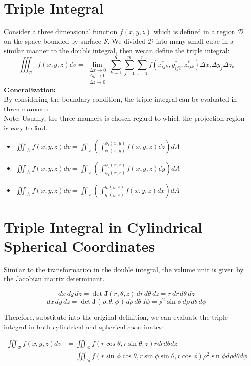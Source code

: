 \documentclass[UTF8,a4paper, 10pt, openany]{svmono}
\begin{document}
\section{Triple Integral}
Consider a three dimensional function $f(x,y,z)$ which is defined in a region $\mathcal{D}$ on the space bounded by surface $\mathcal{S}$. We divided $\mathcal{D}$ into many small cube in a similar manner to the double integral, then wecan define the triple integral:
$$\boxed{\iiint_{\mathcal{D}}f(x,y,z)dv=\lim_{\substack{\Delta x\to 0\\ \Delta y\to 0\\ \Delta z\to 0}}\sum_{k=1}^{q}\sum_{j=1}^{m}\sum_{i=1}^{n}f(x_{ijk}^*,y_{ijk}^*,z_{ijk}^*)\Delta x_{i}\Delta y_{j}\Delta z_{k}}$$
\textbf{Generalization:}\\
By considering the boundary condition, the triple integral can be evaluated in three manners:\\
Note: Usually, the three manners is chosen regard to which the projection region is easy to find.
\begin{itemize}
\item $\displaystyle\iiint_{\mathcal{D}}f(x,y,z)dv=\displaystyle\iint_{\mathcal{R}}\left(\int_{\phi_1(x,y)}^{\phi_2(x,y)}f(x,y,z)dz\right)dA$
\item $\displaystyle\iiint_{\mathcal{D}}f(x,y,z)dv=\displaystyle\iint_{\mathcal{R}}\left(\int_{\psi_1(x,z)}^{\psi_2(x,z)}f(x,y,z)dy\right)dA$
\item $\displaystyle\iiint_{\mathcal{D}}f(x,y,z)dv=\displaystyle\iint_{\mathcal{R}}\left(\int_{g_1(y,z)}^{g_2(y,z)}f(x,y,z)dx\right)dA$
\end{itemize}



\section{Triple Integral in Cylindrical Spherical Coordinates}
Similar to the transformation in the double integral, the volume unit is given by the Jacobian matrix determinant.

\[dx\,dy\,dz=\det \mathbf{J}(r,\theta,z)\,dr\,d\theta \,dz=r\,dr\,d\theta \,dz\]
\[dx\,dy\,dz=\det \mathbf{J}(\rho,\theta,\phi)\,d\rho \,d\theta \,d\phi=\rho ^2\sin \phi \,d\rho \,d\theta \,d\phi\]

Therefore, substitute into the original definition, we can evaluate the triple integral in both cylindrical and spherical coordinates:

\begin{align*}
\iiint_{\mathcal{R}}f(x,y,z)dv &=\iiint_{\mathcal{R}}f(r\cos \theta,r\sin \theta,z)rdrd\theta dz \\
&= \iiint_{\mathcal{R}}f(r\sin \phi \cos \theta,r\sin \phi \sin \theta,r\cos \phi)\rho ^2\sin \phi d\rho d\theta d\phi
\end{align*}
\end{document}
